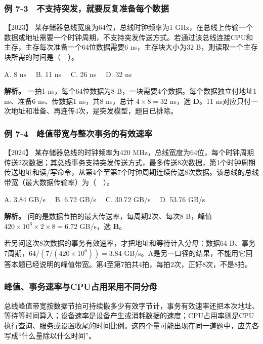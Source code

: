 \subsubsection{例 7-3　不支持突发，就要反复准备每个数据}\label{co-ex7-3}

\noindent{}【2023】 某存储器总线宽度为64位，总线时钟频率为1 GHz，在总线上传输一个数据或地址需要一个时钟周期，不支持突发传送方式。若通过该总线连接CPU和主存，主存每次准备一个64位数据需要6 ns，主存块大小为32 B，则读取一个主存块所需的时间是（　）。

A. 8 ns　 B. 11 ns　 C. 26 ns　 D. 32 ns


\textbf{解析。} 一拍1 ns，每个64位数据为8 B，一块需要4个数据。每个数据独立付地址1 ns、准备6 ns、传数据1 ns，共8 ns，总计 \(4\times8=32\) ns，选 \textbf{D}。11 ns对应只付一次地址和准备、再连传4次，是突发模型，题目已排除。

\subsubsection{例 7-4　峰值带宽与整次事务的有效速率}\label{co-ex7-4}

\noindent{}【2024】 某存储器总线的时钟频率为420 MHz，总线宽度为64位，每个时钟周期传送2次数据；其总线事务支持突发传送方式，最多传送8次数据，第1个时钟周期传送地址和读/写命令，从第4个至第7个时钟周期连续传送8次数据。该总线的总线带宽（最大数据传输率）为（　）。

A. 3.84 GB/s　 B. 6.72 GB/s　 C. 30.72 GB/s　 D. 53.76 GB/s


\textbf{解析。} 问的是数据节拍的最大传送率，每周期2次、每次8 B，峰值 \(420\times10^6\times2\times8=6.72\) GB/s，选 \textbf{B}。

若另问这次8次数据的事务有效速率，才把地址和等待计入分母：数据64 B、事务7周期，\(64/(7/(420\times10^6))=3.84\) GB/s。A是另一口径的结果，不能用它回答本题已经说明的峰值带宽。第4至第7拍共4拍，每拍2次，正好8次，不是8拍。

\subsubsection{峰值、事务速率与CPU占用采用不同分母}\label{ux5cf0ux503cux4e8bux52a1ux901fux7387ux4e0ecpuux5360ux7528ux91c7ux7528ux4e0dux540cux5206ux6bcd}

总线峰值带宽按数据节拍可持续搬多少有效字节计，事务有效速率还把本次地址、等待等时间算入；设备速率是设备产生或消耗数据的速度；CPU占用率则是CPU执行查询、服务或设置收尾的时间比例。这四个量可能出现在同一道题中，应先各写成``什么量除以什么时间''。


